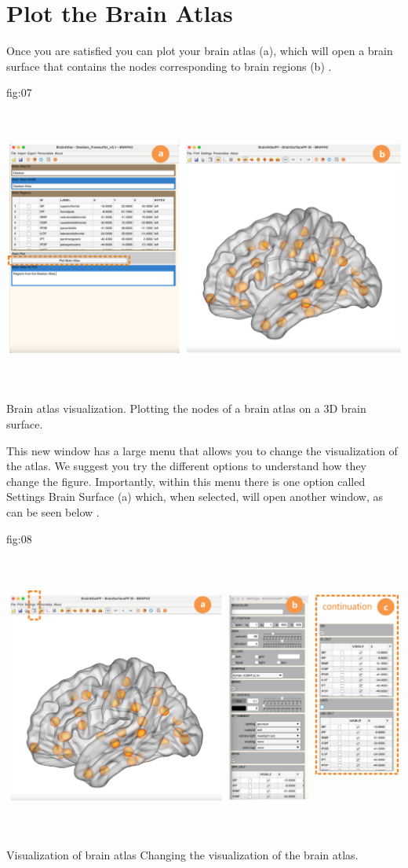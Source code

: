 \documentclass[justified]{tufte-handout}
\begin{document}
\clearpage
\section{Plot the Brain Atlas}

Once you are satisfied you can plot your brain atlas (a), which will open a brain surface that contains the nodes corresponding to brain regions (b) .

	{fig:07}
	{\includegraphics[height=10cm]{tut_ba/fig07.png}}
	{Brain atlas visualization.}
	{
	Plotting the nodes of a brain atlas on a 3D brain surface. 
	}
	
This new window has a large menu that allows you to change the visualization of the atlas. We suggest you try the different options to understand how they change the figure. Importantly, within this menu there is one option called Settings Brain Surface (a) which, when selected, will open another window, as can be seen below .

	{fig:08}
	{\includegraphics[height=10cm]{tut_ba/fig08.png}}
	{Visualization of brain atlas}
	{
	Changing the visualization of the brain atlas. 
	}
\end{document}
